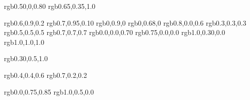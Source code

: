 

\usepackage{color}
\usepackage{xcolor}
\definecolor{darkpurple}  {rgb}{0.50,0,0.80}      %
\definecolor{purple}      {rgb}{0.65,0.35,1.0}    %

\definecolor{spring}    {rgb}{0.6,0.9,0.2}    %
\definecolor{lime}      {rgb}{0.7,0.95,0.10}  %
\definecolor{fluorescentgreen}   {rgb}{0,0.9,0}        %
\definecolor{green}     {rgb}{0,0.68,0}       %
\definecolor{magenta}   {rgb}{0.8,0.0,0.6}    %
\definecolor{dgrey}     {rgb}{0.3,0.3,0.3}    %
\definecolor{grey}      {rgb}{0.5,0.5,0.5}    %
\definecolor{lgrey}     {rgb}{0.7,0.7,0.7}    %
\definecolor{darkblue}  {rgb}{0.0,0.0,0.70}   %
\definecolor{darkred}   {rgb}{0.75,0.0,0.0}   %
\definecolor{orangered} {rgb}{1.0,0.30,0.0}   %
\definecolor{white}     {rgb}{1.0,1.0,1.0}    %

%
\definecolor{skyblue}   {rgb}{0.30,0.5,1.0}



\definecolor{oldcolor}   {rgb}{0.4,0.4,0.6}  %
\definecolor{usedcolor}  {rgb}{0.7,0.2,0.2}  %

\definecolor{note}       {rgb}{0.0,0.75,0.85}     %
\definecolor{oldnote}    {rgb}{1.0,0.5,0.0}       %

